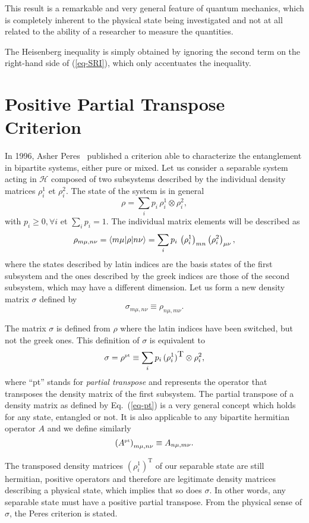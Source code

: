 This result is a remarkable and very general feature of quantum mechanics, which is completely inherent to the physical state being investigated and not at all related to the ability of a researcher to measure the quantities.

The Heisenberg inequality is simply obtained by ignoring  the second term on the right-hand side of (\ref{eq-SRI}), which only accentuates the inequality.

\section{Positive Partial Transpose Criterion} \label{sec-PPT}

In 1996, Asher Peres~\cite{Per96} published a criterion able to characterize the entanglement in bipartite systems, either pure or mixed. Let us consider a separable system acting in $\mathcal{H}$ composed of two subsystems described by the individual density matrices $\rho^1_i$ et $\rho^2_i$. The state of the system is in general
\[ \rho = \sum_i p_i \, \rho^1_i \otimes \rho^2_i, \label{eq-mixed} \]
with $p_i \ge 0, \forall i$ et $\sum_i p_i=1$. The individual matrix elements will be described as
\[  \rho_{m\mu,n\nu}=\langle m \mu | \rho | n \nu \rangle = \sum_i p_i \,\left(\rho^1_i \right)_{mn} \left(\rho^2_i\right)_{\mu\nu},  \]
where the states described by latin indices are the basis states of the first subsystem and the ones described by the greek indices are those of the second subsystem, which may have a different dimension. Let us form a new density matrix $\sigma$ defined by
\[  \sigma_{m\mu,n\nu} \equiv  \rho_{n\mu,m\nu} \label{eq-pt} .\]

The matrix $\sigma$ is defined from $\rho$ where the latin indices have been switched, but not the greek ones. This definition of $\sigma$ is equivalent to
\[ \sigma=\rho^{\mbox{\tiny \textup{pt}}}  \equiv  \sum_i p_i \, (\rho^1_i)^{\mbox{T}} \otimes \rho^2_i, \]
where ``pt'' stands for \textit{partial transpose} and represents the operator that transposes the density matrix of the first subsystem. The partial transpose of a density matrix as defined by Eq.~(\ref{eq-pt}) is a very general concept which holds for any state, entangled or not. It is also applicable to any bipartite hermitian operator $A$ and we define similarly
\[  \left(A^{\mbox{\tiny \textup{pt}}} \right)_{m\mu,n\nu} \equiv  A_{n\mu,m\nu}.\]

The transposed density matrices $(\rho^1_i)^{\mbox{T}}$ of our separable state are still hermitian, positive operators and therefore are legitimate density matrices describing a physical state, which implies that so does $\sigma$. In other words, any separable state must have a positive partial transpose. From the physical sense of $\sigma$, the Peres criterion is stated.

